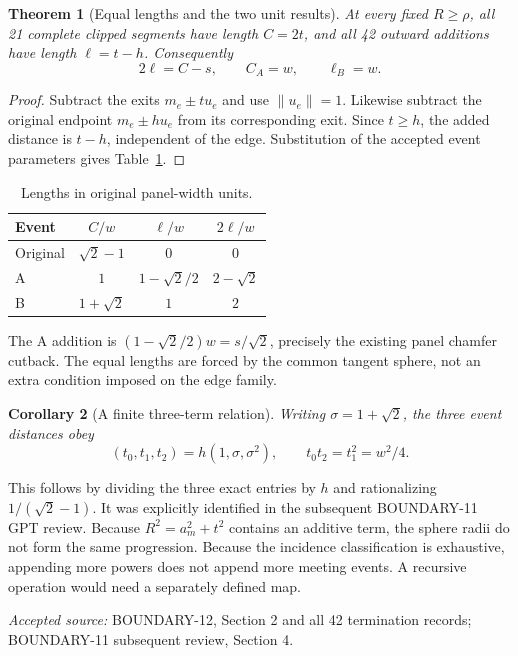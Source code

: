 \documentclass[11pt,a4paper]{article}
\newtheorem{theorem}{Theorem}[section]
\newtheorem{corollary}[theorem]{Corollary}
\newcommand{\source}[1]{\par{\small\emph{Accepted source:} #1}\par}
\begin{document}
\begin{theorem}[Equal lengths and the two unit results]\label{thm:lengths}
At every fixed $R\geq\rho$, all 21 complete clipped segments have length $C=2t$, and all 42 outward additions have length $\ell=t-h$. Consequently
\begin{equation}\label{eq:lengths}
2\ell=C-s,\qquad C_A=w,\qquad \ell_B=w.
\end{equation}
\end{theorem}
\begin{proof}
Subtract the exits $m_e\pm t u_e$ and use $\|u_e\|=1$. Likewise subtract the original endpoint $m_e\pm h u_e$ from its corresponding exit. Since $t\geq h$, the added distance is $t-h$, independent of the edge. Substitution of the accepted event parameters gives Table~\ref{tab:lengths}.
\end{proof}
\begin{table}[ht]\centering\caption{Lengths in original panel-width units.}\label{tab:lengths}
\begin{tabular}{@{}lccc@{}}\toprule Event & $C/w$ & $\ell/w$ & $2\ell/w$\\\midrule
Original&$\sqrt2-1$&$0$&$0$\\
A&$1$&$1-\sqrt2/2$&$2-\sqrt2$\\
B&$1+\sqrt2$&$1$&$2$\\\bottomrule\end{tabular}
\end{table}
The A addition is $(1-\sqrt2/2)w=s/\sqrt2$, precisely the existing panel chamfer cutback. The equal lengths are forced by the common tangent sphere, not an extra condition imposed on the edge family.

\begin{corollary}[A finite three-term relation]\label{cor:ratio}
Writing $\sigma=1+\sqrt2$, the three event distances obey
\begin{equation}\label{eq:progression}
(t_0,t_1,t_2)=h(1,\sigma,\sigma^2),\qquad t_0t_2=t_1^2=w^2/4.
\end{equation}
\end{corollary}
This follows by dividing the three exact entries by $h$ and rationalizing $1/(\sqrt2-1)$. It was explicitly identified in the subsequent BOUNDARY-11 GPT review. Because $R^2=a_m^2+t^2$ contains an additive term, the sphere radii do not form the same progression. Because the incidence classification is exhaustive, appending more powers does not append more meeting events. A recursive operation would need a separately defined map.
\source{BOUNDARY-12, Section 2 and all 42 termination records; BOUNDARY-11 subsequent review, Section 4.}
\end{document}
